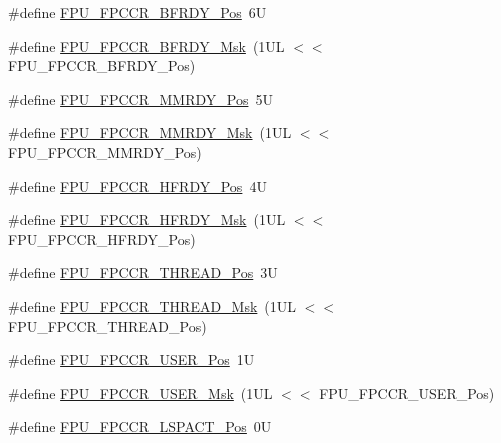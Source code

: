 \begin{DoxyCompactItemize}
\item 
\#define \mbox{\hyperlink{group___c_m_s_i_s___f_p_u_ga6d633920f92c3ce4133d769701619b17}{F\+P\+U\+\_\+\+F\+P\+C\+C\+R\+\_\+\+B\+F\+R\+D\+Y\+\_\+\+Pos}}~6U
\item 
\#define \mbox{\hyperlink{group___c_m_s_i_s___f_p_u_gad349eb1323d8399d54a04c0bfd520cb2}{F\+P\+U\+\_\+\+F\+P\+C\+C\+R\+\_\+\+B\+F\+R\+D\+Y\+\_\+\+Msk}}~(1\+U\+L $<$$<$ F\+P\+U\+\_\+\+F\+P\+C\+C\+R\+\_\+\+B\+F\+R\+D\+Y\+\_\+\+Pos)
\item 
\#define \mbox{\hyperlink{group___c_m_s_i_s___f_p_u_gaccdb481211629f9440431439231187f1}{F\+P\+U\+\_\+\+F\+P\+C\+C\+R\+\_\+\+M\+M\+R\+D\+Y\+\_\+\+Pos}}~5U
\item 
\#define \mbox{\hyperlink{group___c_m_s_i_s___f_p_u_gadedfaec9fdd07261573e823a4dcfb5c4}{F\+P\+U\+\_\+\+F\+P\+C\+C\+R\+\_\+\+M\+M\+R\+D\+Y\+\_\+\+Msk}}~(1\+U\+L $<$$<$ F\+P\+U\+\_\+\+F\+P\+C\+C\+R\+\_\+\+M\+M\+R\+D\+Y\+\_\+\+Pos)
\item 
\#define \mbox{\hyperlink{group___c_m_s_i_s___f_p_u_gab12733991487acc2da41ca300fe36fb6}{F\+P\+U\+\_\+\+F\+P\+C\+C\+R\+\_\+\+H\+F\+R\+D\+Y\+\_\+\+Pos}}~4U
\item 
\#define \mbox{\hyperlink{group___c_m_s_i_s___f_p_u_gaf4beaa279abff34828344bd594fff8a1}{F\+P\+U\+\_\+\+F\+P\+C\+C\+R\+\_\+\+H\+F\+R\+D\+Y\+\_\+\+Msk}}~(1\+U\+L $<$$<$ F\+P\+U\+\_\+\+F\+P\+C\+C\+R\+\_\+\+H\+F\+R\+D\+Y\+\_\+\+Pos)
\item 
\#define \mbox{\hyperlink{group___c_m_s_i_s___f_p_u_ga0937d64c42374200af44b22e5b49fd26}{F\+P\+U\+\_\+\+F\+P\+C\+C\+R\+\_\+\+T\+H\+R\+E\+A\+D\+\_\+\+Pos}}~3U
\item 
\#define \mbox{\hyperlink{group___c_m_s_i_s___f_p_u_ga8d18cd88336d63d4b1810383aa8da700}{F\+P\+U\+\_\+\+F\+P\+C\+C\+R\+\_\+\+T\+H\+R\+E\+A\+D\+\_\+\+Msk}}~(1\+U\+L $<$$<$ F\+P\+U\+\_\+\+F\+P\+C\+C\+R\+\_\+\+T\+H\+R\+E\+A\+D\+\_\+\+Pos)
\item 
\#define \mbox{\hyperlink{group___c_m_s_i_s___f_p_u_gaea663104375ce6be15470e3db294c92d}{F\+P\+U\+\_\+\+F\+P\+C\+C\+R\+\_\+\+U\+S\+E\+R\+\_\+\+Pos}}~1U
\item 
\#define \mbox{\hyperlink{group___c_m_s_i_s___f_p_u_ga2eb70427eeaa7344196219cf5a8620a4}{F\+P\+U\+\_\+\+F\+P\+C\+C\+R\+\_\+\+U\+S\+E\+R\+\_\+\+Msk}}~(1\+U\+L $<$$<$ F\+P\+U\+\_\+\+F\+P\+C\+C\+R\+\_\+\+U\+S\+E\+R\+\_\+\+Pos)
\item 
\#define \mbox{\hyperlink{group___c_m_s_i_s___f_p_u_ga803bf3f6d15b04deaad0801bee5b35ed}{F\+P\+U\+\_\+\+F\+P\+C\+C\+R\+\_\+\+L\+S\+P\+A\+C\+T\+\_\+\+Pos}}~0U
\item 
$$
\end{DoxyCompactItemize}
